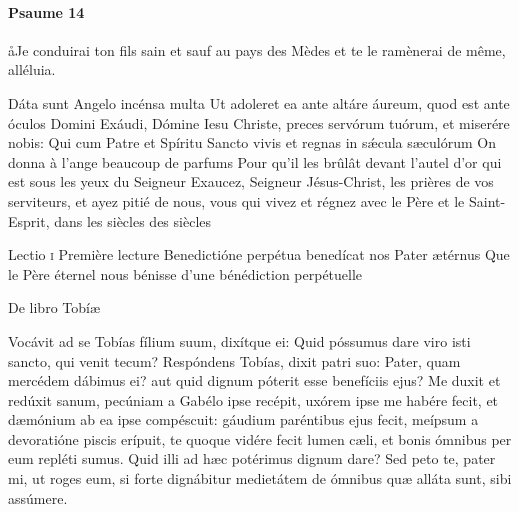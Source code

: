 \documentclass[twoside]{article}
\begin{document}
\begin{paracol}[1]{2}

\begin{enumerate}[wide, itemsep=0mm, labelwidth=!, labelindent=0pt, label=\color{gregoriocolor}\theenumi]

\end{enumerate}

\switchcolumn

\paragraph{Psaume 14}
\aa Je conduirai ton fils sain et sauf au pays des Mèdes et te le ramènerai de même, alléluia.


\begin{enumerate}[wide, itemsep=0mm, labelwidth=!, labelindent=0pt, label=\color{gregoriocolor}\theenumi]

\end{enumerate}

\switchcolumn*

\versiculusabsolutio
	{Dáta sunt Angelo incénsa multa}
	{Ut adoleret ea ante altáre áureum, quod est ante óculos Domini}
	{Exáudi, Dómine Iesu Christe, preces servórum tuórum, et miserére nobis: Qui cum Patre et Spíritu Sancto vivis et regnas in sǽcula sæculórum}
	{On donna à l’ange beaucoup de parfums}
	{Pour qu’il les brûlât devant l’autel d’or qui est sous les yeux du Seigneur}
	{Exaucez, Seigneur Jésus-Christ, les prières de vos serviteurs, et ayez pitié de nous, vous qui vivez et régnez avec le Père et le Saint-Esprit, dans les siècles des siècles}

\lectioresponsorium
	{Lectio \textsc{i}}
	{Première lecture}
	{Benedictióne perpétua benedícat nos Pater ætérnus}
	{Que le Père éternel nous bénisse d'une bénédiction perpétuelle}
	{
		De libro Tobíæ

		Vocávit ad se Tobías fílium suum, dixítque ei: Quid póssumus dare viro isti sancto, qui venit tecum?
		Respóndens Tobías, dixit patri suo: Pater, quam mercédem dábimus ei? aut quid dignum póterit esse benefíciis ejus?
		Me duxit et redúxit sanum, pecúniam a Gabélo ipse recépit, uxórem ipse me habére fecit, et dæmónium ab ea ipse compéscuit: gáudium paréntibus ejus fecit, meípsum a devoratióne piscis erípuit, te quoque vidére fecit lumen cæli, et bonis ómnibus per eum repléti sumus. Quid illi ad hæc potérimus dignum dare?
		Sed peto te, pater mi, ut roges eum, si forte dignábitur medietátem de ómnibus quæ alláta sunt, sibi assúmere.
	}
	{	
		
}
\end{paracol}
\end{document}
